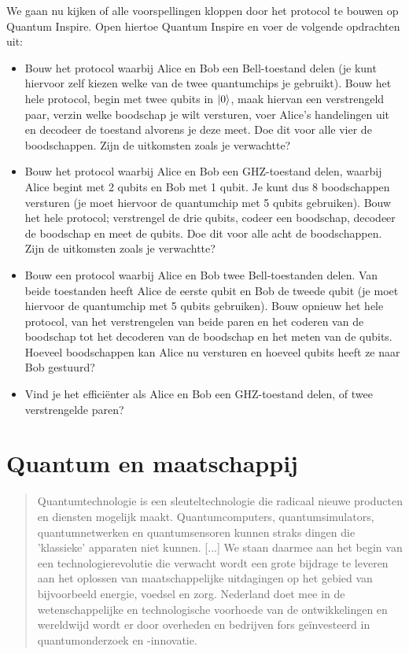 \documentclass[../../main.tex]{subfiles}
\begin{document}
\begin{opdrachtlang}
We gaan nu kijken of alle voorspellingen kloppen door het protocol te bouwen op Quantum Inspire. Open hiertoe Quantum Inspire en voer de volgende opdrachten uit:

\begin{itemize}
\item Bouw het protocol waarbij Alice en Bob een Bell-toestand delen (je kunt hiervoor zelf kiezen welke van de twee quantumchips je gebruikt). Bouw het hele protocol, begin met twee qubits in $\ket{0}$, maak hiervan een verstrengeld paar, verzin welke boodschap je wilt versturen, voer Alice's handelingen uit en decodeer de toestand alvorens je deze meet. Doe dit voor alle vier de boodschappen. Zijn de uitkomsten zoals je verwachtte?
\item Bouw het protocol waarbij Alice en Bob een GHZ-toe\-stand delen, waarbij Alice begint met 2 qubits en Bob met 1 qubit. Je kunt dus 8 boodschappen versturen (je moet hiervoor de quantumchip met 5 qubits gebruiken). Bouw het hele protocol; verstrengel de drie qubits, codeer een boodschap, decodeer de boodschap en meet de qubits. Doe dit voor alle acht de boodschappen. Zijn de uitkomsten zoals je verwachtte?
\item Bouw een protocol waarbij Alice en Bob twee Bell-toe\-standen delen. Van beide toestanden heeft Alice de eerste qubit en Bob de tweede qubit (je moet hiervoor de quantumchip met 5 qubits gebruiken). Bouw opnieuw het hele protocol, van het verstrengelen van beide paren en het coderen van de boodschap tot het decoderen van de boodschap en het meten van de qubits. Hoeveel boodschappen kan Alice nu versturen en hoeveel qubits heeft ze naar Bob gestuurd?

\item Vind je het effici\"{e}nter als Alice en Bob een GHZ-toestand delen, of twee verstrengelde paren?
\end{itemize}
\end{opdrachtlang}

\clearpage
\section{Quantum en maatschappij} \label{sec:poquantumenmaatschappij}

\begin{quote}
Quantumtechnologie is een sleuteltechnologie die radicaal nieuwe producten en diensten mogelijk maakt. Quantumcomputers, quantumsimulators, quantumnetwerken en quantumsensoren kunnen straks dingen die 'klassieke' apparaten niet kunnen. [...] We staan daarmee aan het begin van een technologierevolutie die verwacht wordt een grote bijdrage te leveren aan het oplossen van maatschappelijke uitdagingen op het gebied van bijvoorbeeld energie, voedsel en zorg. Nederland doet mee in de wetenschappelijke en technologische voorhoede van de ontwikkelingen en wereldwijd wordt er door overheden en bedrijven fors geïnvesteerd in quantumonderzoek en -innovatie.
\end{quote}
\end{document}
